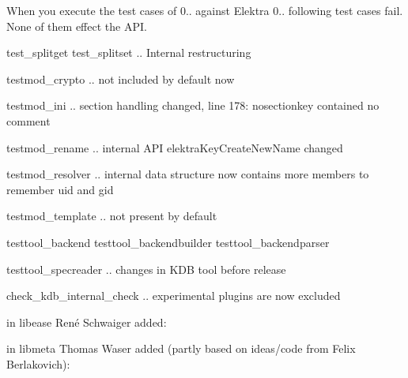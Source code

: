 When you execute the test cases of 0.. against Elektra 0.. following test cases fail. None of them effect the A\+PI.


\begin{DoxyItemize}
\item test\+\_\+splitget test\+\_\+splitset .. Internal restructuring
\item testmod\+\_\+crypto .. not included by default now
\item testmod\+\_\+ini .. section handling changed, line 178\+: {\ttfamily nosectionkey contained no comment}
\item testmod\+\_\+rename .. internal A\+PI elektra\+Key\+Create\+New\+Name changed
\item testmod\+\_\+resolver .. internal data structure now contains more members to remember uid and gid
\item testmod\+\_\+template .. not present by default
\item testtool\+\_\+backend testtool\+\_\+backendbuilder testtool\+\_\+backendparser
\item testtool\+\_\+specreader .. changes in K\+DB tool before release
\item check\+\_\+kdb\+\_\+internal\+\_\+check .. experimental plugins are now excluded
\end{DoxyItemize}

in libease René Schwaiger added\+:


\begin{DoxyCode}{0}
\end{DoxyCode}


in libmeta Thomas Waser added (partly based on ideas/code from Felix Berlakovich)\+:


\begin{DoxyCode}{0}
\end{DoxyCode}


